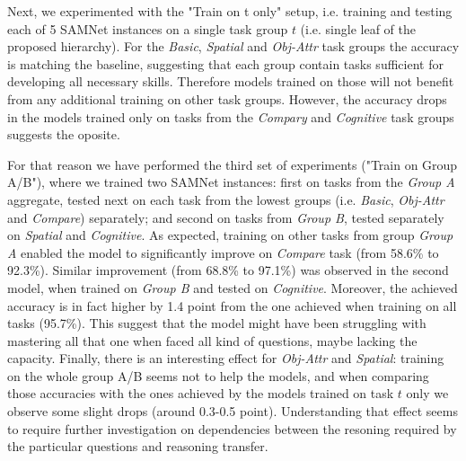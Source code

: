 Next, we experimented with the "Train on t only" setup, i.e. training and testing each of 5 SAMNet instances on a single task group $t$ (i.e. single leaf of the proposed hierarchy).
For the \textit{Basic}, \textit{Spatial} and \textit{Obj-Attr} task groups the accuracy is matching the baseline, suggesting that each group contain tasks sufficient for developing all necessary skills.
Therefore models trained on those will not benefit from any additional training on other task groups.
However, the accuracy drops in the models trained only on tasks from the \textit{Compary} and \textit{Cognitive} task groups suggests the oposite.

For that reason we have performed the third set of experiments ("Train on Group A/B"), where we trained two SAMNet instances: first on tasks from the \textit{Group A} aggregate, tested next on each task from the lowest groups (i.e. \textit{Basic}, \textit{Obj-Attr} and \textit{Compare}) separately; and second on tasks from \textit{Group B}, tested separately on \textit{Spatial} and \textit{Cognitive}.
As expected, training on other tasks from group \textit{Group A} enabled the model to significantly improve on \textit{Compare} task (from 58.6\% to 92.3\%).
Similar improvement (from 68.8\% to 97.1\%) was observed in the second model, when trained on \textit{Group B} and tested on \textit{Cognitive}.
Moreover, the achieved accuracy is in fact higher by 1.4 point from the one achieved when training on all tasks (95.7\%).
This suggest that the model might have been struggling with mastering all that one when faced all kind of questions, maybe lacking the capacity.
Finally, there is an interesting effect for \textit{Obj-Attr} and \textit{Spatial}: training on the whole group A/B seems not to help the models, and when comparing those accuracies with the ones achieved by the models trained on task $t$ only we observe some slight drops (around 0.3-0.5 point).
Understanding that effect seems to require further investigation on dependencies between the resoning required by the particular questions and reasoning transfer.

